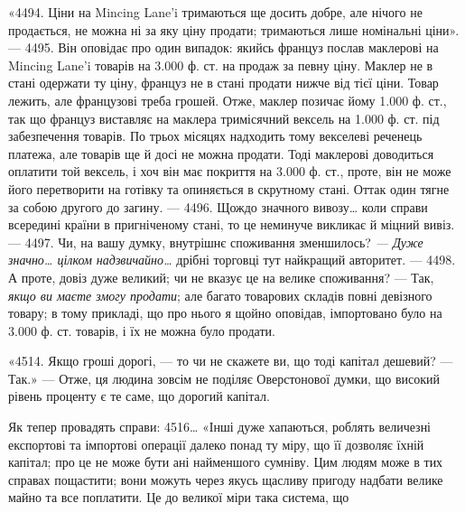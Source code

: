 «4494. Ціни на Mincing Lane’i тримаються ще досить добре, але нічого
не продається, не можна ні за яку ціну продати; тримаються лише номінальні
ціни». — 4495. Він оповідає про один випадок: якийсь француз послав маклерові
на Mincing Lane’i товарів на \num{3.000} ф. ст. на продаж за певну ціну. Маклер
не в стані одержати ту ціну, француз не в стані продати нижче від тієї
ціни. Товар лежить, але французові треба грошей. Отже, маклер позичає йому \num{1.000} ф. ст., так що
француз виставляє на маклера тримісячний вексель на \num{1.000} ф. ст. під забезпечення товарів. По трьох
місяцях надходить тому векселеві
реченець платежа, але товарів ще й досі не можна продати. Тоді маклерові
доводиться оплатити той вексель, і хоч він має покриття на \num{3.000} ф. ст.,
проте, він не може його перетворити на готівку та опиняється в скрутному
стані. Оттак один тягне за собою другого до загину. — 4496. Щождо значного
вивозу\dots{} коли справи всередині країни в пригніченому стані, то це неминуче
викликає й міцний вивіз. — 4497. Чи, на вашу думку, внутрішнє споживання зменшилось?
\emph{— Дуже значно\dots{} цілком надзвичайно\dots{}} дрібні торговці тут
найкращий авторитет. — 4498. А проте, довіз дуже великий; чи не вказує це
на велике споживання? — Так, \emph{якщо ви маєте змогу продати}; але багато
товарових складів повні девізного товару; в тому прикладі, що про нього я щойно
оповідав, імпортовано було на \num{3.000} ф. ст. товарів, і їх не можна було продати.

«4514. Якщо гроші дорогі, — то чи не скажете ви, що тоді капітал дешевий?
— Так.» — Отже, ця людина зовсім не поділяє Оверстонової думки, що
високий рівень проценту є те саме, що дорогий капітал.

Як тепер провадять справи: 4516\dots{} «Інші дуже хапаються, роблять
величезні експортові та імпортові операції далеко понад ту міру, що її дозволяє
їхній капітал; про це не може бути ані найменшого сумніву. Цим людям
може в тих справах пощастити; вони можуть через якусь щасливу пригоду
надбати велике майно та все поплатити. Це до великої міри така система, що
\parbreak{}  %
